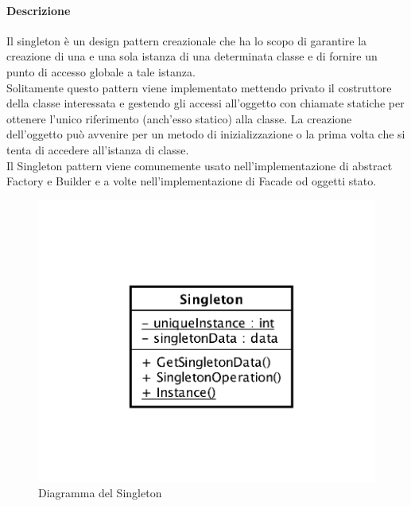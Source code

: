 \paragraph{Descrizione}
Il singleton è un design pattern creazionale che ha lo scopo di garantire la creazione di una e una sola istanza di una determinata classe e di fornire un punto di accesso globale a tale istanza.
\\Solitamente questo pattern viene implementato mettendo privato il costruttore della classe interessata e gestendo gli accessi all'oggetto con chiamate statiche per ottenere l'unico riferimento (anch'esso statico) alla classe. La creazione dell'oggetto può avvenire per un metodo di inizializzazione o la prima volta che si tenta di accedere all'istanza di classe.
\\Il Singleton pattern viene comunemente usato nell'implementazione di abstract Factory e Builder e a volte nell'implementazione di Facade od oggetti stato.
	\begin{figure}[H]
		\label{builder_compara}
		\centering
		\includegraphics[scale=0.7]{img/singleton.png}
		\caption{Diagramma del Singleton}
	\end{figure}
	
